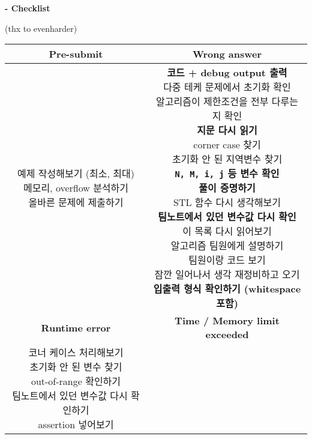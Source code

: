 \documentclass[landscape, 10pt, a4paper, oneside, twocolumn]{extarticle}
\begin{document}
\newpage
\onehalfspacing
\begin{Large}\textbf{- Checklist}\end{Large} 
\begin{small}(thx to evenharder)\end{small}
\begin{table}[H]
    \begin{tabular}{|c|c|}
        \hline
        \textbf{Pre-submit} & \textbf{Wrong answer} \\ \hline
        \makecell{
            예제 작성해보기 (최소, 최대)\\
            메모리, overflow 분석하기 \\
            올바른 문제에 제출하기
        } &
        \makecell{
            \textbf{코드 + debug output 출력} \\
            다중 테케 문제에서 초기화 확인 \\
            알고리즘이 제한조건을 전부 다루는지 확인 \\
            \textbf{지문 다시 읽기} \\ 
            corner case 찾기 \\
            초기화 안 된 지역변수 찾기 \\
            \textbf{\texttt{N, M, i, j} 등 변수 확인} \\
            \textbf{풀이 증명하기} \\
            STL 함수 다시 생각해보기 \\
            \textbf{팀노트에서 있던 변수값 다시 확인} \\
            이 목록 다시 읽어보기 \\
            알고리즘 팀원에게 설명하기 \\
            팀원이랑 코드 보기 \\
            잠깐 일어나서 생각 재정비하고 오기 \\
            \textbf{입출력 형식 확인하기 (whitespace 포함)}
        } \\ \hline
        \textbf{Runtime error} & \textbf{Time / Memory limit exceeded} \\ \hline
        \makecell{
            코너 케이스 처리해보기 \\
            초기화 안 된 변수 찾기 \\
            out-of-range 확인하기 \\
            팀노트에서 있던 변수값 다시 확인하기 \\ 
            assertion 넣어보기 \\
}
\end{tabular}
\end{table}
\end{document}
